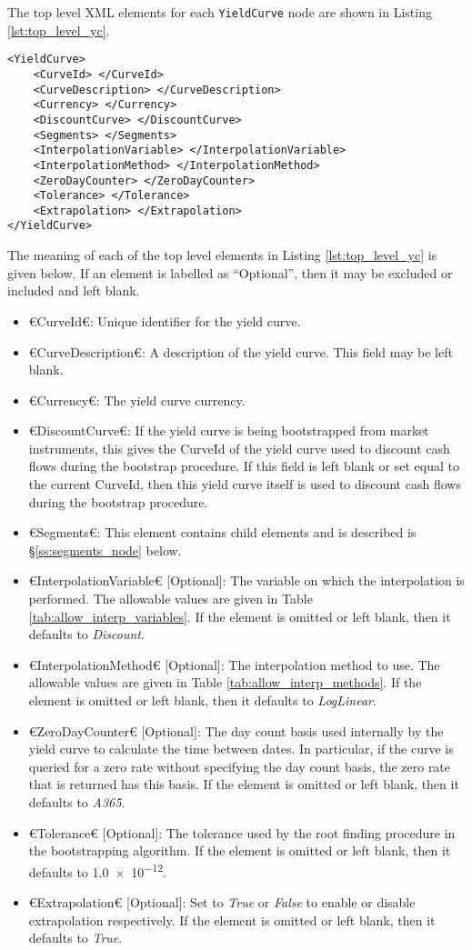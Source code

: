 The top level XML elements for each \lstinline!YieldCurve! node are shown in Listing \ref{lst:top_level_yc}.

{\footnotesize
\begin{lstlisting}[caption=Top level yield curve node, label=lst:top_level_yc]
<YieldCurve>
	<CurveId> </CurveId>
	<CurveDescription> </CurveDescription>
	<Currency> </Currency>
	<DiscountCurve> </DiscountCurve>
	<Segments> </Segments>
	<InterpolationVariable> </InterpolationVariable>
	<InterpolationMethod> </InterpolationMethod>
	<ZeroDayCounter> </ZeroDayCounter>
	<Tolerance> </Tolerance>
	<Extrapolation> </Extrapolation>
</YieldCurve>
\end{lstlisting}
}

The meaning of each of the top level elements in Listing \ref{lst:top_level_yc} is given below. If an element is labelled 
as ``Optional'', then it may be excluded or included and left blank.
\begin{itemize}
\item €CurveId€: Unique identifier for the yield curve.
\item €CurveDescription€: A description of the yield curve. This field may be left blank.
\item €Currency€: The yield curve currency.
\item €DiscountCurve€: If the yield curve is being bootstrapped from market instruments, this gives the CurveId of the yield 
curve used to discount cash flows during the bootstrap procedure. If this field is left blank or set equal to the current 
CurveId, then this yield curve itself is used to discount cash flows during the bootstrap procedure.
\item €Segments€: This element contains child elements and is described is \S \ref{ss:segments_node} below.
\item €InterpolationVariable€ [Optional]: The variable on which the interpolation is performed. The allowable values are 
given in Table \ref{tab:allow_interp_variables}. If the element is omitted or left blank, then it defaults to 
\emph{Discount}.
\item €InterpolationMethod€ [Optional]: The interpolation method to use. The allowable values are given in Table 
\ref{tab:allow_interp_methods}. If the element is omitted or left blank, then it defaults to \emph{LogLinear}.
\item €ZeroDayCounter€ [Optional]: The day count basis used internally by the yield curve to calculate the time between 
dates. In particular, if the curve is queried for a zero rate without specifying the day count basis, the zero rate that 
is returned has this basis. If the element is omitted or left blank, then it defaults to \emph{A365}.
\item €Tolerance€ [Optional]: The tolerance used by the root finding procedure in the bootstrapping algorithm. If the 
element is omitted or left blank, then it defaults to \num[scientific-notation=true]{1.0e-12}.
\item €Extrapolation€ [Optional]: Set to \emph{True} or \emph{False} to enable or disable extrapolation respectively. If the 
element is omitted or left blank, then it defaults to \emph{True}.
\end{itemize}

